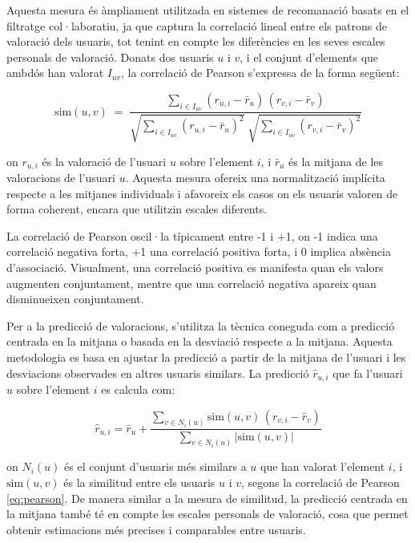 \documentclass[a4paper,12pt]{report}
\begin{document}
Aquesta mesura és àmpliament utilitzada en sistemes de recomanació basats en el filtratge col·laboratiu, ja que captura la correlació lineal entre els patrons de valoració dels usuaris, tot tenint en compte les diferències en les seves escales personals de valoració. Donats dos usuaris \( u \) i \( v \), i el conjunt d’elements que ambdós han valorat \( I_{uv} \), la correlació de Pearson s’expressa de la forma següent:

\begin{equation}\label{eq:pearson}
\mathrm{sim}(u,v) \;=\; 
\frac{\sum_{i \in I_{uv}} (r_{u,i} - \bar r_u)\,(r_{v,i} - \bar r_v)}
     {\sqrt{\sum_{i \in I_{uv}} (r_{u,i} - \bar r_u)^2}\;
      \sqrt{\sum_{i \in I_{uv}} (r_{v,i} - \bar r_v)^2}}
\end{equation}


on \( r_{u,i} \) és la valoració de l’usuari \( u \) sobre l’element \( i \), i \( \bar{r}_u \) és la mitjana de les valoracions de l’usuari \( u \). Aquesta mesura ofereix una normalització implícita respecte a les mitjanes individuals i afavoreix els casos on els usuaris valoren de forma coherent, encara que utilitzin escales diferents.

La correlació de Pearson oscil·la típicament entre -1 i +1, on -1 indica una correlació negativa forta, +1 una correlació positiva forta, i 0 implica absència d’associació. Visualment, una correlació positiva es manifesta quan els valors augmenten conjuntament, mentre que una correlació negativa apareix quan disminueixen conjuntament.

Per a la predicció de valoracions, s’utilitza la tècnica coneguda com a predicció centrada en la mitjana o basada en la desviació respecte a la mitjana. Aquesta metodologia es basa en ajustar la predicció a partir de la mitjana de l’usuari i les desviacions observades en altres usuaris similars. La predicció \( \hat{r}_{u,i} \) que fa l’usuari \( u \) sobre l’element \( i \) es calcula com:

\[
\hat r_{u,i}
= \bar r_u
+ \frac{\sum_{v\in N_i(u)} \text{sim}(u,v)\,(r_{v,i}-\bar r_v)}
       {\sum_{v\in N_i(u)} |\text{sim}(u,v)|}
\]

on \( N_i(u) \) és el conjunt d’usuaris més similars a \( u \) que han valorat l’element \( i \), i \( \text{sim}(u,v) \) és la similitud entre els usuaris \( u \) i \( v \), segons la correlació de Pearson \ref{eq:pearson}. De manera similar a la mesura de similitud, la predicció centrada en la mitjana també té en compte les escales personals de valoració, cosa que permet obtenir estimacions més precises i comparables entre usuaris.
\end{document}

